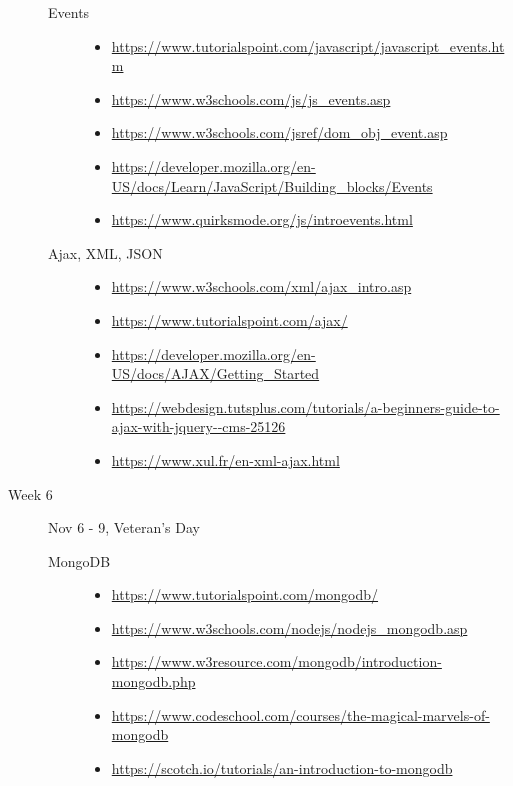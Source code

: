 \documentclass{article}
\begin{document}
\begin{description}
\begin{description}
\item[Events]\mbox{}
  \begin{itemize}
  \item\scriptsize\url{https://www.tutorialspoint.com/javascript/javascript_events.htm}
  \item\scriptsize\url{https://www.w3schools.com/js/js_events.asp}
  \item\scriptsize\url{https://www.w3schools.com/jsref/dom_obj_event.asp}
  \item\scriptsize\url{https://developer.mozilla.org/en-US/docs/Learn/JavaScript/Building_blocks/Events}
  \item\scriptsize\url{https://www.quirksmode.org/js/introevents.html}
  \end{itemize}    

\item[Ajax, XML, JSON]\mbox{}
  \begin{itemize}
  \item\scriptsize\url{https://www.w3schools.com/xml/ajax_intro.asp}
  \item\scriptsize\url{https://www.tutorialspoint.com/ajax/}
  \item\scriptsize\url{https://developer.mozilla.org/en-US/docs/AJAX/Getting_Started}
  \item\scriptsize\url{https://webdesign.tutsplus.com/tutorials/a-beginners-guide-to-ajax-with-jquery--cms-25126}
  \item\scriptsize\url{https://www.xul.fr/en-xml-ajax.html}
  \end{itemize}

  \end{description}
\item[Week 6]  Nov 6 - 9, Veteran's Day
  \begin{description}

\item[MongoDB]\mbox{}
  \begin{itemize}
  \item\scriptsize\url{https://www.tutorialspoint.com/mongodb/}
  \item\scriptsize\url{https://www.w3schools.com/nodejs/nodejs_mongodb.asp}
  \item\scriptsize\url{https://www.w3resource.com/mongodb/introduction-mongodb.php}
  \item\scriptsize\url{https://www.codeschool.com/courses/the-magical-marvels-of-mongodb}
  \item\scriptsize\url{https://scotch.io/tutorials/an-introduction-to-mongodb}
  \end{itemize}


\end{description}
\end{description}
\end{document}
